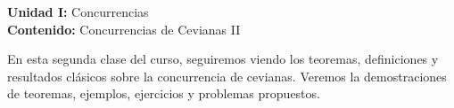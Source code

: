 {\Large
    \textbf{Unidad I:} Concurrencias\vspace{2mm}\\
    \textbf{Contenido:} Concurrencias de Cevianas II
}

En esta segunda clase del curso, seguiremos viendo los teoremas, definiciones y resultados clásicos sobre la concurrencia de cevianas.
Veremos la demostraciones de teoremas, ejemplos, ejercicios y problemas propuestos.